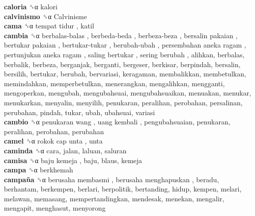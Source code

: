 \textbf{caloria} ␝α  kalori  \\
\textbf{calvinismo} ␝α   Calvinisme   \\
\textbf{cama} ␝α   tempat tidur , katil  \\
\textbf{cambia} ␝α   berbalas-balas ,  berbeda-beda ,  berbeza-beza ,  bersalin pakaian ,  bertukar pakaian ,  bertukar-tukar ,  berubah-ubah ,  persembahan aneka ragam ,  pertunjukan aneka ragam ,  saling bertukar ,  sering berubah , alihkan, berbalas, berbalik, berbeza, berganjak, berganti, bergeser, berkisar, berpindah, bersalin, bersilih, bertukar, berubah, bervariasi, keragaman, membalikkan, membetulkan, memindahkan, memperbetulkan, menerangkan, mengalihkan, mengganti, mengoperkan, mengubah, mengubahsuai, mengubahsuaikan, menuakan, menukar, menukarkan, menyalin, menyilih, penukaran, peralihan, perobahan, persalinan, perubahan, pindah, tukar, ubah, ubahsuai, variasi  \\
\textbf{cambio} ␝α   penukaran wang ,  uang kembali , pengubahsuaian, penukaran, peralihan, perobahan, perubahan  \\
\textbf{camel} ␝α   rokok cap unta , unta  \\
\textbf{caminda} ␝α  cara, jalan, laluan, saluran  \\
\textbf{camisa} ␝α   baju kemeja , baju, blaus, kemeja  \\
\textbf{campa} ␝α  berkhemah  \\
\textbf{campaña} ␝α   berusaha membasmi ,  berusaha menghapuskan , beradu, berhantam, berkempen, berlari, berpolitik, bertanding, hidup, kempen, melari, melawan, memasang, mempertandingkan, mendesak, menekan, mengalir, mengapit, menghasut, menyorong  \\
